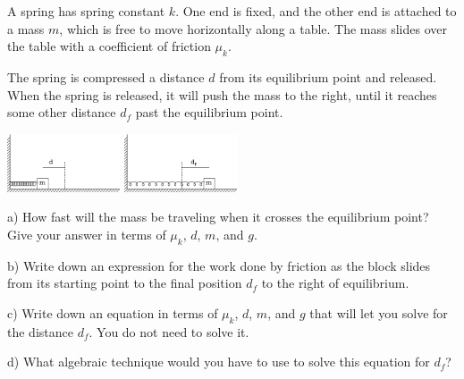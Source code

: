 \documentclass[12pt]{article}
\begin{document}
\newpage


A spring has spring constant $k$. One end is fixed, and the other end is attached to a mass $m$, which is free to move horizontally along a table. The mass slides over the table with a coefficient of friction $\mu_k$.

The spring is compressed a distance $d$ from its equilibrium point and released. When the spring is released, it will push the mass to the right, until it reaches some other distance $d_f$ past the equilibrium point.

\bigskip


\centerline{
	\includegraphics[width=0.25\textwidth]{4a-crop.pdf}\hspace{0.1\textwidth}
	\includegraphics[width=0.25\textwidth]{4b-crop.pdf}
}


a) How fast will the mass be traveling when it crosses the equilibrium point? Give your answer in terms of $\mu_k$, $d$, $m$, and $g$. 

\vspace{1in}

b) Write down an expression for the work done by friction as the block slides from its starting point to the final position $d_f$ to the right of equilibrium. 

\vspace{1in}

c) Write down an equation in terms of $\mu_k$, $d$, $m$, and $g$ that will let you solve for the distance $d_f$. You do not need to solve it. 

\vspace{1in}

d) What algebraic technique would you have to use to solve this equation for $d_f$?




 
\end{document}
